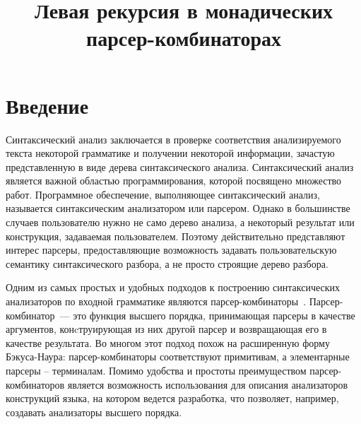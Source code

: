 \documentclass[conference]{IEEEtran}
\begin{document}
\title{Левая рекурсия в монадических парсер-комбинаторах}

\author{
}

\maketitle

\begin{abstract}



\end{abstract}

\begin{IEEEkeywords}



\end{IEEEkeywords}

\section{Введение}

Синтаксический анализ заключается в проверке соответствия анализируемого текста некоторой грамматике и получении некоторой информации, зачастую представленную в виде дерева синтаксического анализа. Синтаксический анализ является важной областью программирования, которой посвящено множество работ. Программное обеспечение, выполняющее синтаксический анализ, называется синтаксическим анализатором или парсером. Однако в большинстве случаев пользователю нужно не само дерево анализа, а некоторый результат или конструкция, задаваемая пользователем. Поэтому действительно представляют интерес парсеры, предоставляющие возможность задавать пользовательскую семантику синтаксического разбора, а не просто строящие дерево разбора.

Одним из самых простых и удобных подходов к построению синтаксических анализаторов по входной грамматике являются парсер-комбинаторы~\cite{meijer}. Парсер-комбинатор~--- это функция высшего порядка, принимающая парсеры в качестве аргументов, конcтруирующая из них другой парсер и возвращающая его в качестве результата. Во многом этот подход похож на расширенную форму Бэкуса-Наура: парсер-комбинаторы соответствуют примитивам, а элементарные парсеры -- терминалам. Помимо удобства и простоты преимуществом парсер-комбинаторов является возможность использования для описания анализаторов конструкций языка, на котором ведется разработка, что позволяет, например, создавать анализаторы высшего порядка.
\end{document}
